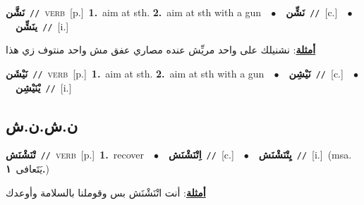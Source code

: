 \documentclass[10pt,a4paper,twoside]{article} %
\begin{document}
\begin{multicols}{2}
{\setlength\topsep{0pt}\textbf{\foreignlanguage{arabic}{نَشَّن}}\ {\color{gray}\texttt{//}\color{black}}\ \textsc{verb}\ [p.]\ \textbf{1.}~aim at sth.  \textbf{2.}~aim at sth with a gun\ \ $\bullet$\ \ \setlength\topsep{0pt}\textbf{\foreignlanguage{arabic}{نَشِّن}}\ {\color{gray}\texttt{//}\color{black}}\ [c.]\ \ $\bullet$\ \ \setlength\topsep{0pt}\textbf{\foreignlanguage{arabic}{ينَشِّن}}\ {\color{gray}\texttt{//}\color{black}}\ [i.]\  \begin{flushright}\color{gray}\foreignlanguage{arabic}{\textbf{\underline{\foreignlanguage{arabic}{أمثلة}}}: نشنيلك على واحد مريِّش عنده مصاري عفق مش واحد منتوف زي هذا}\end{flushright}\color{black}} \vspace{2mm}

{\setlength\topsep{0pt}\textbf{\foreignlanguage{arabic}{نَيْشَن}}\ {\color{gray}\texttt{//}\color{black}}\ \textsc{verb}\ [p.]\ \textbf{1.}~aim at sth.  \textbf{2.}~aim at sth with a gun\ \ $\bullet$\ \ \setlength\topsep{0pt}\textbf{\foreignlanguage{arabic}{نَيْشِن}}\ {\color{gray}\texttt{//}\color{black}}\ [c.]\ \ $\bullet$\ \ \setlength\topsep{0pt}\textbf{\foreignlanguage{arabic}{يْنَيْشِن}}\ {\color{gray}\texttt{//}\color{black}}\ [i.]\ } \vspace{2mm}

\vspace{-3mm}
\subsection*{\color{blue}\foreignlanguage{arabic}{ن.ش.ن.ش}\color{blue}{}} 

{\setlength\topsep{0pt}\textbf{\foreignlanguage{arabic}{تْنَشْنَش}}\ {\color{gray}\texttt{//}\color{black}}\ \textsc{verb}\ [p.]\ \textbf{1.}~recover\ \ $\bullet$\ \ \setlength\topsep{0pt}\textbf{\foreignlanguage{arabic}{اِتْنَشْنَش}}\ {\color{gray}\texttt{//}\color{black}}\ [c.]\ \ $\bullet$\ \ \setlength\topsep{0pt}\textbf{\foreignlanguage{arabic}{يِتْنَشْنَش}}\ {\color{gray}\texttt{//}\color{black}}\ [i.]\ \color{gray}(msa. \foreignlanguage{arabic}{يَتَعافى}~\foreignlanguage{arabic}{\textbf{١.}})\color{black}\  \begin{flushright}\color{gray}\foreignlanguage{arabic}{\textbf{\underline{\foreignlanguage{arabic}{أمثلة}}}: أنت اتْنَشْنَش بس وقوملنا بالسلامة وأوعدك}\end{flushright}\color{black}} \vspace{2mm}


\end{multicols}
\end{document}
